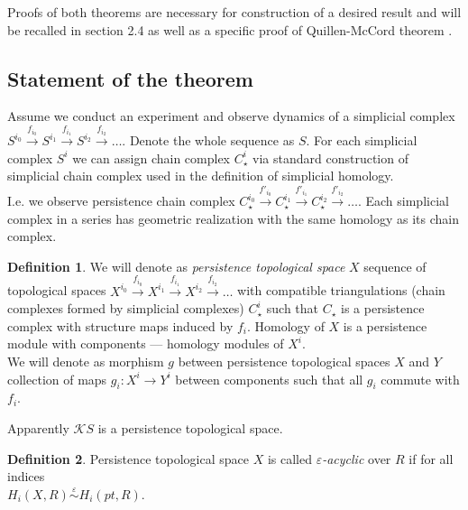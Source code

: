\documentclass[a4paper, 12pt]{article}
\theoremstyle{definition}
\newtheorem{definition}{Definition}
\theoremstyle{remark}
\newcommand{\define}[1]{{\textit{#1}}}
\begin{document}
Proofs of both theorems are necessary for construction of a desired result and will be recalled in section 2.4 as well as a specific proof of Quillen-McCord theorem {\cite[Proof of Theorem 1.1]{Bar11}}.\\

\subsection{Statement of the theorem}

Assume we conduct an experiment and observe dynamics of a simplicial complex $S^{i_0} \xrightarrow{f_{i_0}} S^{i_1} \xrightarrow{f_{i_1}} S^{i_2} \xrightarrow{f_{i_2}} \ldots$. Denote the whole sequence as $S$. For each simplicial complex $S^{i}$ we can assign chain complex $C_{\star}^{i}$ via standard construction of simplicial chain complex used in the definition of simplicial homology.\\

I.e. we observe persistence chain complex $C_{\star}^{i_0} \xrightarrow{f'_{i_0}} C_{\star}^{i_1} \xrightarrow{f'_{i_1}} C_{\star}^{i_2} \xrightarrow{f'_{i_2}} \ldots$. Each simplicial complex in a series has geometric realization with the same homology as its chain complex.

\begin{definition}
  We will denote as \define{persistence topological space} $X$ sequence of topological spaces $X^{i_0} \xrightarrow{f_{i_0}} X^{i_1} \xrightarrow{f_{i_1}} X^{i_2} \xrightarrow{f_{i_2}} \ldots$ with compatible triangulations (chain complexes formed by simplicial complexes) $C_{\star}^{i}$ such that $C_{\star}$ is a persistence complex with structure maps induced by $f_i$. Homology of $X$ is a persistence module with components --- homology modules of $X^i$.\\

  We will denote as morphism $g$ between persistence topological spaces $X$ and $Y$ collection of maps $g_i : X^i \to Y^i$ between components such that all $g_i$ commute with $f_i$.
\end{definition}

Apparently $\mathcal{K}S$ is a persistence topological space.\\

\begin{definition}
  Persistence topological space $X$ is called \define{$\varepsilon$-acyclic} over $R$ if for all indices\\ $H_i(X,R) \stackrel{\varepsilon}{\sim} H_i(pt,R)$.
\end{definition}
\end{document}
